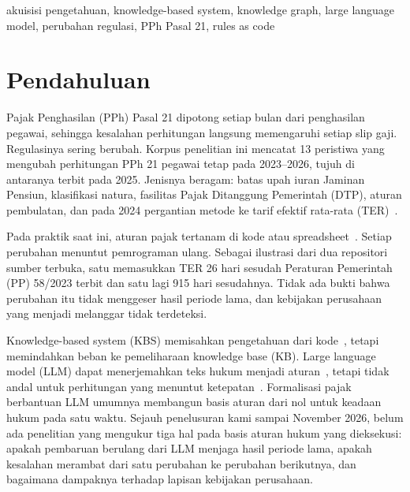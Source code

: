 \documentclass[conference]{IEEEtran}
\makeatletter
\DeclareRobustCommand{\en}[1]{{\usefont{\f@encoding}{\f@family}{\f@series}{it}#1\/}}
\makeatother
\begin{document}
\begin{IEEEkeywords}
akuisisi pengetahuan, \en{knowledge-based system}, \en{knowledge graph}, \en{large language model}, perubahan regulasi, PPh Pasal 21, \en{rules as code}
\end{IEEEkeywords}

\section{Pendahuluan}
\label{sec:pendahuluan}
Pajak Penghasilan (PPh) Pasal 21 dipotong setiap bulan dari penghasilan pegawai, sehingga kesalahan perhitungan langsung memengaruhi setiap slip gaji. Regulasinya sering berubah. Korpus penelitian ini mencatat 13 peristiwa yang mengubah perhitungan PPh 21 pegawai tetap pada 2023--2026, tujuh di antaranya terbit pada 2025. Jenisnya beragam: batas upah iuran Jaminan Pensiun, klasifikasi natura, fasilitas Pajak Ditanggung Pemerintah (DTP), aturan pembulatan, dan pada 2024 pergantian metode ke tarif efektif rata-rata (TER)~\cite{pp58_2023,pmk168_2023}.

Pada praktik saat ini, aturan pajak tertanam di kode atau \en{spreadsheet}~\cite{ramadhani2021grossup,kusuma2026pph21}. Setiap perubahan menuntut pemrograman ulang. Sebagai ilustrasi dari dua repositori sumber terbuka, satu memasukkan TER 26 hari sesudah Peraturan Pemerintah (PP) 58/2023 terbit dan satu lagi 915 hari sesudahnya. Tidak ada bukti bahwa perubahan itu tidak menggeser hasil periode lama, dan kebijakan perusahaan yang menjadi melanggar tidak terdeteksi.

\en{Knowledge-based system} (KBS) memisahkan pengetahuan dari kode~\cite{merigoux2021catala}, tetapi memindahkan beban ke pemeliharaan \en{knowledge base} (KB). \en{Large language model} (LLM) dapat menerjemahkan teks hukum menjadi aturan~\cite{janatian2023texttostructure}, tetapi tidak andal untuk perhitungan yang menuntut ketepatan~\cite{nay2024taxattorneys,dahl2024legalfictions}. Formalisasi pajak berbantuan LLM umumnya membangun basis aturan dari nol untuk keadaan hukum pada satu waktu. Sejauh penelusuran kami sampai November 2026, belum ada penelitian yang mengukur tiga hal pada basis aturan hukum yang dieksekusi: apakah pembaruan berulang dari LLM menjaga hasil periode lama, apakah kesalahan merambat dari satu perubahan ke perubahan berikutnya, dan bagaimana dampaknya terhadap lapisan kebijakan perusahaan.
\end{document}
